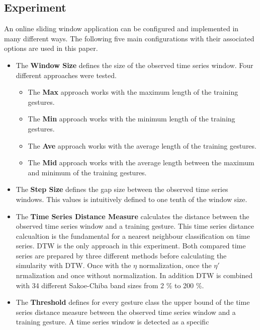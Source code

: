 \subsection{Experiment} \label{experiment}

An online sliding window application can be configured and implemented in many different ways. The following five main
configurations with their associated options are used in this paper.

\begin{itemize}
    \item The \textbf{Window Size} defines the size of the observed time series window. Four different approaches were
        tested.
        \begin{itemize}
            \item The \textbf{Max} approach works with the maximum length of the training gestures.
            \item The \textbf{Min} approach works with the minimum length of the training gestures.
            \item The \textbf{Ave} approach works with the average length of the training gestures.
            \item The \textbf{Mid} approach works with the average length between the maximum and minimum of the
                training gestures.
        \end{itemize}
    \item The \textbf{Step Size} defines the gap size between the observed time series windows. This values is
        intuitively defined to one tenth of the window size.
    \item The \textbf{Time Series Distance Measure} calculates the distance between the observed time series window and
        a training gesture. This time series distance calcualtion is the fundamental for a nearest neighbour
        classification on time series. DTW is the only approach in this experiment. Both compared time series are
        prepared by three different methods before calculating the simularity with DTW. Once with the $\eta$
        normalization, once the $\eta '$ nrmalization and once without normalization. In addition DTW is combined with
        34 different Sakoe-Chiba band sizes from 2 \% to 200 \%.
    \item The \textbf{Threshold} defines for every gesture class the upper bound of the time series distance measure
        between the observed time series window and a training gesture. A time series window is detected as a specific

\end{itemize}
